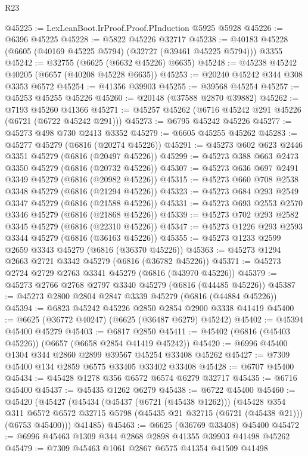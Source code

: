 \begin{lexlean}{R23}
\begin{coremodule}
@45225 := LexLeanBoot.IrProof.Proof.PInduction @5925 @5928
@45226 := @6396 @45225
@45228 := @5822 @45226 @32717
@45238 := @40183 @45228 (@6605 (@40169 @45225 @5794) (@32727 (@39461 @45225 @5794))) @3355
@45242 := @32755 (@6625 (@6632 @45226) @6635)
@45248 := @45238 @45242 @40205 (@6657 (@40208 @45228 @6635))
@45253 := @20240 @45242 @344 @308 @3353 @6572
@45254 := @41356 @39903
@45255 := @39568 @45254
@45257 := @45253 @45255 @45226
@45260 := @20148 (@37588 @2870 @39882)
@45262 := @7193 @45260 @41366
@45271 := @45257 @45262 (@6716 @45242 @291 @45226 (@6721 (@6722 @45242 @291)))
@45273 := @6795 @45242 @45226
@45277 := @45273 @498 @730 @2413 @3352
@45279 := @6605 @45255 @45262
@45283 := @45277 @45279 (@6816 (@20274 @45226))
@45291 := @45273 @602 @623 @2446 @3351 @45279 (@6816 (@20497 @45226))
@45299 := @45273 @388 @663 @2473 @3350 @45279 (@6816 (@20732 @45226))
@45307 := @45273 @636 @697 @2491 @3349 @45279 (@6816 (@20982 @45226))
@45315 := @45273 @660 @708 @2538 @3348 @45279 (@6816 (@21294 @45226))
@45323 := @45273 @684 @293 @2549 @3347 @45279 (@6816 (@21588 @45226))
@45331 := @45273 @693 @2553 @2570 @3346 @45279 (@6816 (@21868 @45226))
@45339 := @45273 @702 @293 @2582 @3345 @45279 (@6816 (@22310 @45226))
@45347 := @45273 @1226 @293 @2593 @3344 @45279 (@6816 (@36163 @45226))
@45355 := @45273 @1233 @2599 @2659 @3343 @45279 (@6816 (@36370 @45226))
@45363 := @45273 @1294 @2663 @2721 @3342 @45279 (@6816 (@36782 @45226))
@45371 := @45273 @2724 @2729 @2763 @3341 @45279 (@6816 (@43970 @45226))
@45379 := @45273 @2766 @2768 @2797 @3340 @45279 (@6816 (@44485 @45226))
@45387 := @45273 @2800 @2804 @2847 @3339 @45279 (@6816 (@44884 @45226))
@45394 := @6823 @45242 @45226 @2850 @2854 @2900 @3338 @41419
@45400 := @6625 (@36772 @40247) (@6625 (@36487 @6279) @45242)
@45402 := @45394 @45400 @45279
@45403 := @6817 @2850
@45411 := @45402 (@6816 (@45403 @45226)) (@6657 (@6658 @2854 @41419 @45242))
@45420 := @6996 @45400 @1304 @344 @2860 @2899 @39567 @45254 @33408 @45262
@45427 := @7309 @45400 @134 @2859 @6575 @33405 @33402 @33408
@45428 := @6707 @45400
@45434 := @45428 @1278 @356 @6572 @6574 @6279 @32717
@45435 := @6716 @45400
@45437 := @45435 @1262 @6279
@45438 := @6722 @45400
@45460 := @45420
    (@45427
      (@45434
        (@45437 (@6721 (@45438 @1262)))
        (@45428
          @354
          @311
          @6572
          @6572
          @32715
          @5798
          (@45435 @21 @32715 (@6721 (@45438 @21)))
          (@6753 @45400)))
      @41485)
@45463 := @6625 (@36769 @33408) @45400
@45472 := @6996 @45463 @1309 @344 @2868 @2898 @41355 @39903 @41498 @45262
@45479 := @7309 @45463 @1061 @2867 @6575 @41354 @41509 @41498

\end{coremodule}
\end{lexlean}
